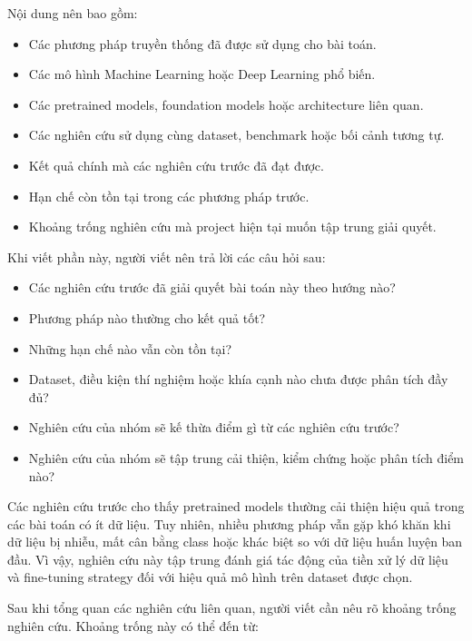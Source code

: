 \documentclass[12pt]{ai_conquer2026}
\begin{document}
Nội dung nên bao gồm:

\begin{itemize}
    \item Các phương pháp truyền thống đã được sử dụng cho bài toán.
    \item Các mô hình Machine Learning hoặc Deep Learning phổ biến.
    \item Các pretrained models, foundation models hoặc architecture liên quan.
    \item Các nghiên cứu sử dụng cùng dataset, benchmark hoặc bối cảnh tương tự.
    \item Kết quả chính mà các nghiên cứu trước đã đạt được.
    \item Hạn chế còn tồn tại trong các phương pháp trước.
    \item Khoảng trống nghiên cứu mà project hiện tại muốn tập trung giải quyết.
\end{itemize}

Khi viết phần này, người viết nên trả lời các câu hỏi sau:

\begin{itemize}
    \item Các nghiên cứu trước đã giải quyết bài toán này theo hướng nào?
    \item Phương pháp nào thường cho kết quả tốt?
    \item Những hạn chế nào vẫn còn tồn tại?
    \item Dataset, điều kiện thí nghiệm hoặc khía cạnh nào chưa được phân tích đầy đủ?
    \item Nghiên cứu của nhóm sẽ kế thừa điểm gì từ các nghiên cứu trước?
    \item Nghiên cứu của nhóm sẽ tập trung cải thiện, kiểm chứng hoặc phân tích điểm nào?
\end{itemize}


\begin{aivncodebox}[Ví dụ:]
    
Các nghiên cứu trước cho thấy pretrained models thường cải thiện hiệu quả trong các bài toán có ít dữ liệu. Tuy nhiên, nhiều phương pháp vẫn gặp khó khăn khi dữ liệu bị nhiễu, mất cân bằng class hoặc khác biệt so với dữ liệu huấn luyện ban đầu. Vì vậy, nghiên cứu này tập trung đánh giá tác động của tiền xử lý dữ liệu và fine-tuning strategy đối với hiệu quả mô hình trên dataset được chọn.
\end{aivncodebox}

Sau khi tổng quan các nghiên cứu liên quan, người viết cần nêu rõ khoảng trống nghiên cứu. Khoảng trống này có thể đến từ:
\end{document}
